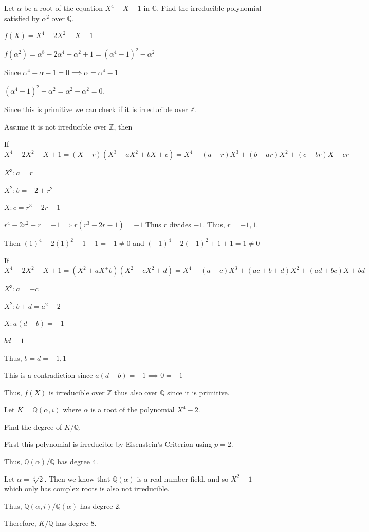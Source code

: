 \documentclass[12pt, letterpaper]{article}
\newcommand{\C}{\mathbb{C}}
\newcommand{\Q}{\mathbb{Q}}
\newcommand{\Z}{\mathbb{Z}}
\begin{document}
\begin{subproblem}{}
    Let $\alpha$ be a root of the equation $X^4 - X - 1$ in $\C$. Find
the irreducible polynomial satisfied by $\alpha^2$ over $\Q$.
\end{subproblem}
\begin{problemproof}
    $f(X)=X^4-2X^2-X+1$

    $f(\alpha^2)=\alpha^8-2\alpha^4-\alpha^2+1=(\alpha^4-1)^2-\alpha^2$

    Since $\alpha^4-\alpha-1=0 \implies \alpha=\alpha^4-1$

    $(\alpha^4-1)^2-\alpha^2=\alpha^2-\alpha^2=0$.

    Since this is primitive we can check if it is irreducible over $\Z$.

    Assume it is not irreducible over $\Z$, then

    If $X^4-2X^2-X+1=(X-r)(X^3+aX^2+bX+c)=X^4+(a-r)X^3+(b-ar)X^2+(c-br)X-cr$

    $X^3: a=r$

    $X^2: b=-2+r^2$

    $X: c=r^3-2r-1$

    $r^4-2r^2-r=-1 \implies r(r^3-2r-1)=-1$ Thus $r$ divides $-1$. Thus, $r=-1,1$.

    Then $(1)^4-2(1)^2-1+1=-1 \neq 0$ and $(-1)^4-2(-1)^2+1+1=1 \neq 0$

    If $X^4-2X^2-X+1=(X^2+aX^+b)(X^2+cX^2+d)=X^4+(a+c)X^3+(ac+b+d)X^2+(ad+bc)X+bd$

    $X^3: a=-c$

    $X^2: b+d=a^2-2$

    $X: a(d-b)=-1$

    $bd=1$

    Thus, $b=d=-1,1$

    This is a contradiction since $a(d-b)=-1 \implies 0=-1$

    Thus, $f(X)$ is irreducible over $\Z$ thus also over $\Q$ since it is primitive.
\end{problemproof}

\begin{problem}{}
    Let $K = \Q (\alpha, i )$ where $\alpha$ is a root of the polynomial $X^4 -
2$.
\end{problem}

\begin{subproblem}{}
    Find the degree of $K/\Q$.
\end{subproblem}
\begin{problemproof}
    First this polynomial is irreducible by Eisenstein's Criterion using $p=2$.

    Thus, $\Q(\alpha)/ \Q$ has degree 4.

    Let $\alpha=\sqrt[4]{2}$. Then we know that $\Q(\alpha)$ is a real number field, and so $X^2-1$ which only has complex roots is also not irreducible.

    Thus, $\Q(\alpha,i)/\Q(\alpha)$ has degree 2.

    Therefore, $K/ \Q$ has degree 8.
\end{problemproof}
\end{document}
